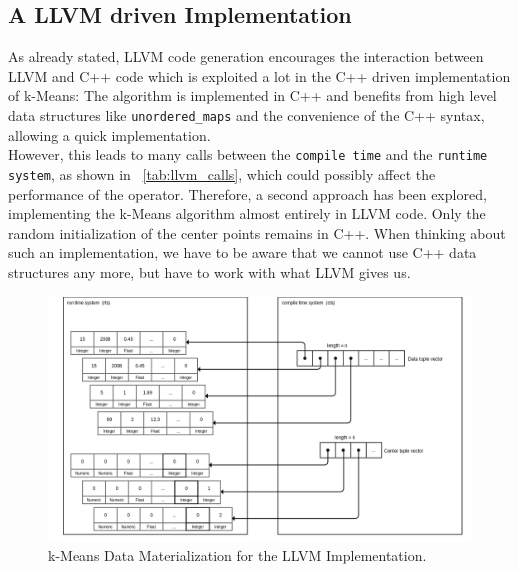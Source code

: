 \subsection{A LLVM driven Implementation}

As already stated, LLVM code generation encourages the interaction between LLVM and C++ code which is exploited a lot in the C++ driven implementation of k-Means: The algorithm is implemented in C++ and benefits from high level data structures like \texttt{unordered\_maps} and the convenience of the C++ syntax, allowing a quick implementation. 
\\
However, this leads to many calls between the \texttt{compile time} and the \texttt{runtime system}, as shown in ~\autoref{tab:llvm_calls}, which could possibly affect the performance of the operator. Therefore, a second approach has been explored, implementing the k-Means algorithm almost entirely in LLVM code. Only the random initialization of the center points remains in C++. When thinking about such an implementation, we have to be aware that we cannot use C++ data structures any more, but have to work with what LLVM gives us.


\begin{figure}[htsb]
  \centering
  \includegraphics[scale=0.25]{figures/mat4}
  \caption[k-Means Data Materialization for the LLVM Implementation]{k-Means Data Materialization for the LLVM Implementation.}
  \label{fig:mat4}
\end{figure}

